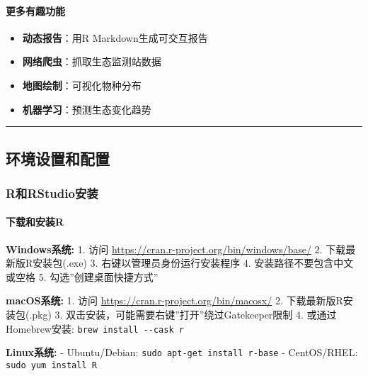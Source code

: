 \documentclass[
]{book}
\providecommand{\tightlist}{%
  \setlength{\itemsep}{0pt}\setlength{\parskip}{0pt}}
\begin{document}
\hypertarget{ux66f4ux591aux6709ux8da3ux529fux80fd}{%
\paragraph{更多有趣功能}\label{ux66f4ux591aux6709ux8da3ux529fux80fd}}

\begin{itemize}
\tightlist
\item
  \textbf{动态报告}：用R Markdown生成可交互报告
\item
  \textbf{网络爬虫}：抓取生态监测站数据
\item
  \textbf{地图绘制}：可视化物种分布
\item
  \textbf{机器学习}：预测生态变化趋势
\end{itemize}

\begin{center}\rule{0.5\linewidth}{0.5pt}\end{center}

\hypertarget{ux73afux5883ux8bbeux7f6eux548cux914dux7f6e}{%
\subsection{环境设置和配置}\label{ux73afux5883ux8bbeux7f6eux548cux914dux7f6e}}

\hypertarget{rux548crstudioux5b89ux88c5}{%
\subsubsection{R和RStudio安装}\label{rux548crstudioux5b89ux88c5}}

\hypertarget{ux4e0bux8f7dux548cux5b89ux88c5r}{%
\paragraph{下载和安装R}\label{ux4e0bux8f7dux548cux5b89ux88c5r}}

\textbf{Windows系统:}
1. 访问 \url{https://cran.r-project.org/bin/windows/base/}
2. 下载最新版R安装包(.exe)
3. 右键以管理员身份运行安装程序
4. 安装路径不要包含中文或空格
5. 勾选''创建桌面快捷方式''

\textbf{macOS系统:}
1. 访问 \url{https://cran.r-project.org/bin/macosx/}
2. 下载最新版R安装包(.pkg)
3. 双击安装，可能需要右键''打开''绕过Gatekeeper限制
4. 或通过Homebrew安装: \texttt{brew\ install\ -\/-cask\ r}

\textbf{Linux系统:}
- Ubuntu/Debian: \texttt{sudo\ apt-get\ install\ r-base}
- CentOS/RHEL: \texttt{sudo\ yum\ install\ R}
\end{document}
